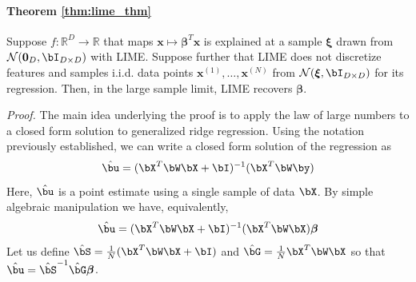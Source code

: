 \documentclass[11pt]{article}
\begin{document}
            \paragraph{\textbf{Theorem \ref{thm:lime_thm}}}
                Suppose $f:\mathbb{R}^D\rightarrow \mathbb{R}$ that maps $\mathbf{x} \mapsto \boldsymbol{\beta}^T \mathbf{x}$ is explained at a sample $\boldsymbol{\xi}$ drawn from $\mathcal{N}(\mathbf{0}_D, \bI_{D\times D})$ with LIME. Suppose further that LIME does not discretize features and samples i.i.d. data points $\mathbf{x}^{(1)},\ldots,\mathbf{x}^{(N)}$ from $ \mathcal{N}(\boldsymbol{\xi}, \bI_{D\times D})$ for its regression.
                 Then, in the large sample limit, LIME recovers $\boldsymbol{\beta}$.   

\noindent \emph{Proof.}
    The main idea underlying the proof is to apply the law of large numbers to a closed form solution to generalized ridge regression. Using the notation previously established, we can write a closed form solution of the regression as
    \begin{equation}
        \label{eq:closed_form}
        \hat{\bu} = (\bX^T \bW \bX + \bI)^{-1}(\bX^T \bW \by)
    \end{equation}
    Here, $\hat{\bu}$ is a point estimate using a single sample of data $\bX$. By simple algebraic manipulation we have, equivalently, 
    \begin{gather*}
         \hat{\bu} =  (\bX^T \bW \bX + \bI)^{-1}(\bX^T \bW \bX) \boldsymbol{\beta}
    \end{gather*}
    Let us define $\hat{\bS} = \frac{1}{N}(\bX^T \bW \bX + \bI) $ and $\hat{\bG} = \frac{1}{N}\bX^T \bW \bX$ so that $\hat{\bu} = \hat{\bS}^{-1}\hat{\bG}\boldsymbol{\beta}$.
    
\end{document}
